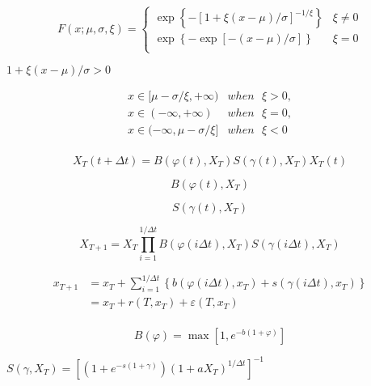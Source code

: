 \[F\left( x;\mu ,\sigma ,\xi  \right)=\left\{ \begin{matrix}
   \exp \left\{ -{{[1+\xi (x-\mu )/\sigma ]}^{-1/\xi }} \right\} & \xi \ne 0  \\
   \exp \left\{ -\exp \left[ -(x-\mu )/\sigma  \right] \right\} & \xi =0  \\
\end{matrix} \right.\]

$1+\xi (x-\mu )/\sigma >0$

\[\begin{array}{*{35}{l}}
   x\in [\mu -\sigma /\xi ,+\infty ) & when\text{ }\xi >0,  \\
   x\in (-\infty ,+\infty ) & when\text{ }\xi =0,  \\
   x\in (-\infty ,\mu -\sigma /\xi ] & when\text{ }\xi <0  \\
\end{array}\]

\[{{X}_{T}}\left( t+\Delta t \right)=B\left( \varphi \left( t \right),{{X}_{T}} \right)S\left( \gamma \left( t \right),{{X}_{T}} \right){{X}_{T}}\left( t \right)\]

\[B\left( \varphi \left( t \right),{{X}_{T}} \right)\]

\[S\left( \gamma \left( t \right),{{X}_{T}} \right)\]

\[{{X}_{T+1}}={{X}_{T}}\prod\limits_{i=1}^{1/\Delta t}{B\left( \varphi \left( i\Delta t \right),{{X}_{T}} \right)S\left( \gamma \left( i\Delta t \right),{{X}_{T}} \right)}\]

\[\begin{array}{*{35}{l}}
   {{x}_{T+1}} & ={{x}_{T}}+\sum\limits_{i=1}^{1/\Delta t}{\left\{ b\left( \varphi \left( i\Delta t \right),{{x}_{T}} \right)+s\left( \gamma \left( i\Delta t \right),{{x}_{T}} \right) \right\}}  \\
   {} & ={{x}_{T}}+r\left( T,{{x}_{T}} \right)+\varepsilon \left( T,{{x}_{T}} \right)  \\
\end{array}\]

\[B\left( \varphi  \right)=\max \left[ 1,{{e}^{-b\left( 1+\varphi  \right)}} \right]\]

$S\left( \gamma ,{{X}_{T}} \right)={{\left[ \left( 1+{{e}^{-s\left( 1+\gamma  \right)}} \right){{\left( 1+a{{X}_{T}} \right)}^{1/\Delta t}} \right]}^{-1}}$




